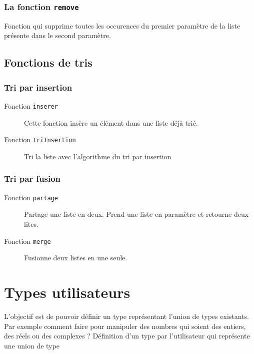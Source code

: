 \subsubsection{La fonction \texttt{remove}}
Fonction qui supprime toutes les occurences du premier paramètre de la liste présente dans le second paramètre.


\subsection{Fonctions de tris}
\subsubsection{Tri par insertion}
\begin{description}
	\item[Fonction \texttt{inserer}] Cette fonction insère un élément dans une liste déjà trié.\\

	\item[Fonction \texttt{triInsertion}] Tri la liste avec l'algorithme du tri par insertion\\
		
\end{description}

\subsubsection{Tri par fusion}
\begin{description}
	\item[Fonction \texttt{partage}]Partage une liste en deux. Prend une liste en paramètre et retourne deux lites.
	
	\item[Fonction \texttt{merge}] Fusionne deux listes en une seule.
	
\end{description}




\section{Types utilisateurs}
L'objectif est de pouvoir définir un type représentant l'union de types existants.
Par exemple comment faire pour manipuler des nombres qui
soient des entiers, des réels ou des complexes ? Définition d'un type par l'utilisateur qui représente une
union de type

